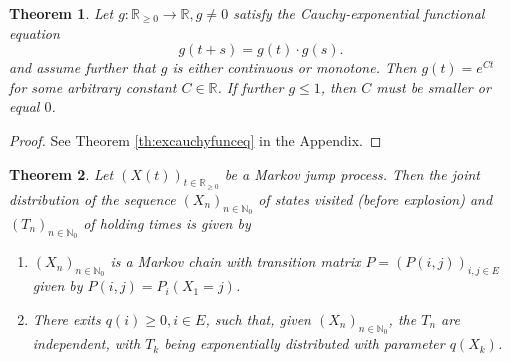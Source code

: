 \documentclass[12pt,a4paper]{scrartcl}
\newtheorem{theorem}{Theorem}[section]
\numberwithin{equation}{section}
\newcommand{\R}{\mathbb{R}} %
\newcommand{\N}{\mathbb{N}} %
\begin{document}
\begin{theorem}
Let $g:\R_{\geq 0} \to \R, g \neq 0$ satisfy the Cauchy-exponential functional equation
\begin{equation}
g\left(t+s\right) = g\left(t\right) \cdot g\left(s\right).
\end{equation} 
and assume further that $g$ is either continuous or monotone.
Then $g\left(t\right) = e^{Ct}$ for some arbitrary constant $C \in \R$. If further $g \leq 1$, then $C$ must be smaller or equal $0$.
\end{theorem}
\begin{proof}
See Theorem \ref{th:excauchyfunceq} in the Appendix.
\end{proof}


\begin{theorem}
\label{th:embeddedchainandholdingtimes}
Let $\left(X\left(t\right)\right)_{t \in \R_{\geq 0}}$ be a Markov jump process. Then the joint distribution of the sequence $ \left(X_n\right)_{n \in \N_0} $ of states visited (before explosion) and $\left(T_n\right)_{n \in \N_0}$ of holding times is given by 
\begin{enumerate}
\item $ \left(X_n\right)_{n \in \N_0} $ is a Markov chain with transition matrix $ P = \left(P\left(i,j\right)\right)_{i,j \in E} $ given by $ P\left(i,j\right) = P_i\left(X_1 = j\right) $.
\item There exits $ q\left(i\right) \geq 0 , i \in E$, such that, given $ \left(X_n\right)_{n \in \N_0} $, the $ T_n $ are independent, with $T_k$ being exponentially distributed with parameter $q\left(X_k\right)$.
\end{enumerate}
\end{theorem}
\end{document}
